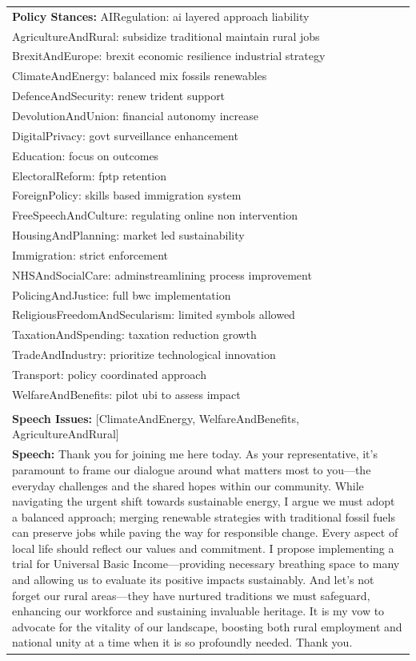 \documentclass[11pt]{article}
\begin{document}
\begin{table}[ht]
\begin{tabularx}{\textwidth}{X}
\textbf{Policy Stances:} 
AIRegulation: ai layered approach liability \\
AgricultureAndRural: subsidize traditional maintain rural jobs \\
BrexitAndEurope: brexit economic resilience industrial strategy \\
ClimateAndEnergy: balanced mix fossils renewables \\
DefenceAndSecurity: renew trident support \\
DevolutionAndUnion: financial autonomy increase \\
DigitalPrivacy: govt surveillance enhancement \\
Education: focus on outcomes \\
ElectoralReform: fptp retention \\
ForeignPolicy: skills based immigration system \\
FreeSpeechAndCulture: regulating online non intervention \\
HousingAndPlanning: market led sustainability \\
Immigration: strict enforcement \\
NHSAndSocialCare: adminstreamlining process improvement \\
PolicingAndJustice: full bwc implementation \\
ReligiousFreedomAndSecularism: limited symbols allowed \\
TaxationAndSpending: taxation reduction growth \\
TradeAndIndustry: prioritize technological innovation \\
Transport: policy coordinated approach \\
WelfareAndBenefits: pilot ubi to assess impact \\
\\[4pt]

\textbf{Speech Issues:} [ClimateAndEnergy, WelfareAndBenefits, AgricultureAndRural] \\[4pt]

\textbf{Speech:} Thank you for joining me here today. As your representative, it's paramount to frame our dialogue around what matters most to you—the everyday challenges and the shared hopes within our community. While navigating the urgent shift towards sustainable energy, I argue we must adopt a balanced approach; merging renewable strategies with traditional fossil fuels can preserve jobs while paving the way for responsible change. Every aspect of local life should reflect our values and commitment. I propose implementing a trial for Universal Basic Income—providing necessary breathing space to many and allowing us to evaluate its positive impacts sustainably. And let’s not forget our rural areas—they have nurtured traditions we must safeguard, enhancing our workforce and sustaining invaluable heritage. It is my vow to advocate for the vitality of our landscape, boosting both rural employment and national unity at a time when it is so profoundly needed. Thank you. \\[4pt]


\end{tabularx}
\end{table}
\end{document}
